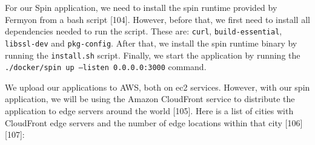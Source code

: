 For our Spin application, we need to install the spin runtime provided by Fermyon from a bash script [104]. However, before that, we first need to install all dependencies needed to run the script. These are: \texttt{curl}, \texttt{build-essential}, \texttt{libssl-dev} and \texttt{pkg-config}. After that, we install the spin runtime binary by running the \texttt{install.sh} script. Finally, we start the application by running the \newline\texttt{./docker/spin up --listen 0.0.0.0:3000} command.

We upload our applications to AWS, both on ec2 services. However, with our spin application,
we will be using the Amazon CloudFront service to distribute the application to edge servers around the world [105]. Here is a list of cities with CloudFront edge servers and the number of edge locations within that city [106] [107]:

